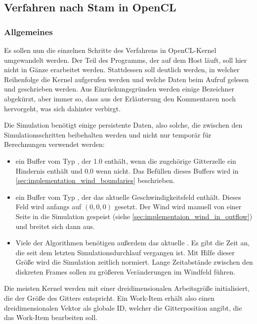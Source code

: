 \subsection{Verfahren nach Stam in OpenCL}

\subsubsection{Allgemeines}
\label{sec:implementation_wind_stam_general}

Es sollen nun die einzelnen Schritte des Verfahrens in OpenCL-Kernel
umgewandelt werden. Der Teil des Programms, der auf dem Host läuft,
soll hier nicht in Gänze erarbeitet werden. Stattdessen soll deutlich
werden, in welcher Reihenfolge die Kernel aufgerufen werden und welche
Daten beim Aufruf gelesen und geschrieben werden. Aus
Einrückungsgründen werden einige Bezeichner abgekürzt, aber immer so,
dass aus der Erläuterung \Pimiddybzw den Kommentaren noch hervorgeht, was
sich dahinter verbirgt.

Die Simulation benötigt einige persistente Daten, also solche, die
zwischen den Simulationsschritten beibehalten werden und nicht nur
temporär für Berechnungen verwendet werden:

\begin{itemize}
\item ein Buffer  vom Typ
, der 1.0 enthält, wenn die zugehörige
Gitterzelle ein Hindernis enthält und 0.0 wenn nicht. Das Befüllen
dieses Buffers wird in
\autoref{sec:implementation_wind_boundaries} beschrieben.
\item ein Buffer  vom Typ
, der das aktuelle Geschwindigkeitsfeld enthält.
Dieses Feld wird anfangs auf $(0,0,0)$ gesetzt. Der Wind wird manuell von
einer Seite in die Simulation gespeist (siehe
\autoref{sec:implementaion_wind_in_outflow}) und breitet sich dann
aus.
\item Viele der Algorithmen benötigen außerdem das aktuelle
 . Es gibt die
Zeit an, die seit dem letzten Simulationsdurchlauf vergangen ist. Mit
Hilfe dieser Größe wird die Simulation zeitlich normiert. Lange
Zeitabstände zwischen den diskreten Frames sollen zu größeren
Veränderungen im Windfeld führen.
\end{itemize}

Die meisten Kernel werden mit einer dreidimensionalen Arbeitsgröße
initialisiert, die der Größe des Gitters entspricht. Ein Work-Item
erhält also einen dreidimensionalen Vektor als globale ID, welcher die
Gitterposition angibt, die das Work-Item bearbeiten soll.

